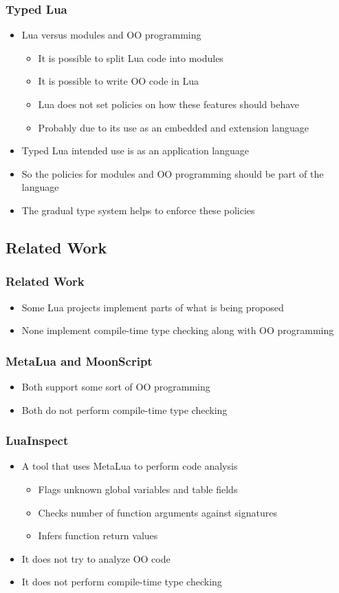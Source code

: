 \documentclass{beamer}
\begin{document}
\begin{frame}
\frametitle{Typed Lua}
\begin{itemize}
\item Lua versus modules and OO programming
\begin{itemize}
\item It is possible to split Lua code into modules
\item It is possible to write OO code in Lua
\item Lua does not set policies on how these features should behave
\item Probably due to its use as an embedded and extension language
\end{itemize}
\item Typed Lua intended use is as an application language
\item So the policies for modules and OO programming should be
part of the language
\item The gradual type system helps to enforce these policies
\end{itemize}
\end{frame}

\subsection{Related Work}
\begin{frame}
\frametitle{Related Work}
\begin{itemize}
\item Some Lua projects implement parts of what is being proposed
\item None implement compile-time type checking along with OO programming
\end{itemize}
\end{frame}

\begin{frame}
\frametitle{MetaLua and MoonScript}
\begin{itemize}
\item Both support some sort of OO programming
\item Both do not perform compile-time type checking
\end{itemize}
\end{frame}

\begin{frame}
\frametitle{LuaInspect}
\begin{itemize}
\item A tool that uses MetaLua to perform code analysis
\begin{itemize}
\item Flags unknown global variables and table fields
\item Checks number of function arguments against signatures
\item Infers function return values
\end{itemize}
\item It does not try to analyze OO code
\item It does not perform compile-time type checking
\end{itemize}
\end{frame}
\end{document}

